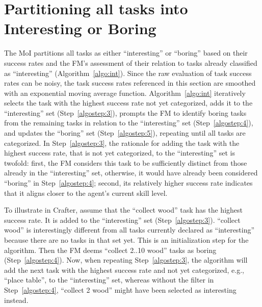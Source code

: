 \documentclass{article} %
\begin{document}
\section{Partitioning all tasks into Interesting or Boring}
\label{app:moi-partition}
The MoI partitions all tasks as either ``interesting'' or ``boring'' based on their success rates and the FM's assessment of their relation to tasks already classified as ``interesting'' (Algorithm~\ref{algo:int}). Since the raw evaluation of task success rates can be noisy, the task success rates referenced in this section are smoothed with an exponential moving average function. Algorithm~\ref{algo:int} iteratively selects the task with the highest success rate not yet categorized, adds it to the ``interesting'' set (Step~\ref{algostep:3}), prompts the FM to identify boring tasks from the remaining tasks in relation to the ``interesting'' set (Step~\ref{algostep:4}), and updates the ``boring'' set (Step~\ref{algostep:5}), repeating until all tasks are categorized. In Step~\ref{algostep:3}, the rationale for adding the task with the highest success rate, that is not yet categorized, to the ``interesting'' set is twofold: first, the FM considers this task to be sufficiently distinct from those already in the ``interesting'' set, otherwise, it would have already been considered ``boring'' in Step~\ref{algostep:4}; second, its relatively higher success rate indicates that it aligns closer to the agent's current skill level.

To illustrate in Crafter, assume that the ``collect wood'' task has the highest success rate. It is added to the ``interesting'' set (Step~\ref{algostep:3}). ``collect wood'' is interestingly different from all tasks currently declared as ``interesting'' because there are no tasks in that set yet. This is an initialization step for the algorithm. Then the FM deems ``collect 2..10 wood'' tasks as boring (Step~\ref{algostep:4}). Now, when repeating Step~\ref{algostep:3}, the algorithm will add the next task with the highest success rate and not yet categorized, e.g., ``place table'', to the ``interesting'' set, whereas without the filter in Step~\ref{algostep:4}, ``collect 2 wood'' might have been selected as interesting instead.
\end{document}
